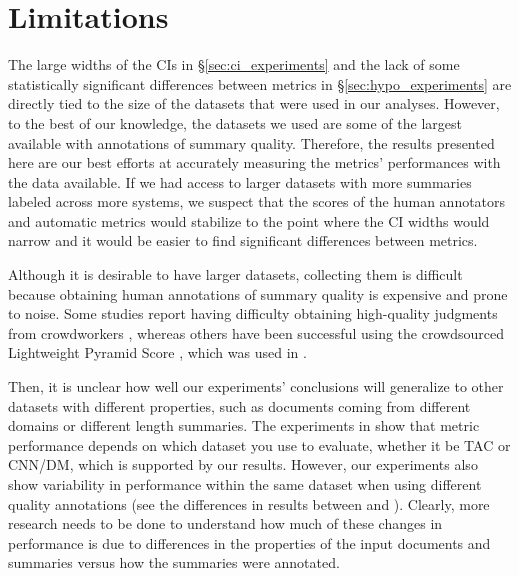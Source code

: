 \section{Limitations}
The large widths of the CIs in \S\ref{sec:ci_experiments} and the lack of some statistically significant differences between metrics in \S\ref{sec:hypo_experiments} are directly tied to the size of the datasets that were used in our analyses.
However, to the best of our knowledge, the datasets we used are some of the largest available with annotations of summary quality.
Therefore, the results presented here are our best efforts at accurately measuring the metrics' performances with the data available.
If we had access to larger datasets with more summaries labeled across more systems, we suspect that the scores of the human annotators and automatic metrics would stabilize to the point where the CI widths would narrow and it would be easier to find significant differences between metrics.

Although it is desirable to have larger datasets, collecting them is difficult because obtaining human annotations of summary quality is expensive and prone to noise.
Some studies report having difficulty obtaining high-quality judgments from crowdworkers \citep{GillickLi10,FKMSR21}, whereas others have been successful using the crowdsourced Lightweight Pyramid Score \citep{SGGRPBAD19}, which was used in \citet{BGALN20}.

Then, it is unclear how well our experiments' conclusions will generalize to other datasets with different properties, such as documents coming from different domains or different length summaries.
The experiments in \citet{BGALN20} show that metric performance depends on which dataset you use to evaluate, whether it be TAC or CNN/DM, which is supported by our results.
However, our experiments also show variability in performance within the same dataset when using different quality annotations (see the differences in results between \citet{FKMSR21} and \cite{BGALN20}).
Clearly, more research needs to be done to understand how much of these changes in performance is due to differences in the properties of the input documents and summaries versus how the summaries were annotated.